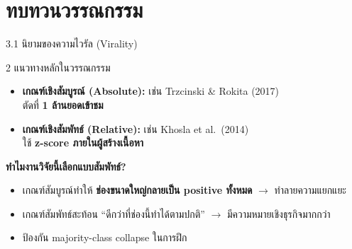 \documentclass[aspectratio=169,11pt,xcolor=dvipsnames]{beamer}
\newcommand{\hl}[1]{\textcolor{kmitlOrange}{\textbf{#1}}}
\begin{document}
\section{ทบทวนวรรณกรรม}

\begin{frame}{3.1 นิยามของความไวรัล (Virality)}
  \begin{block}{2 แนวทางหลักในวรรณกรรม}
    \begin{itemize}
      \item \textbf{เกณฑ์เชิงสัมบูรณ์ (Absolute):} เช่น Trzcinski \& Rokita (2017)\\
        ตัดที่ \hl{1 ล้านยอดเข้าชม}
      \item \textbf{เกณฑ์เชิงสัมพัทธ์ (Relative):} เช่น Khosla et al.\ (2014)\\
        ใช้ \hl{z-score ภายในผู้สร้างเนื้อหา}
    \end{itemize}
  \end{block}
  \textbf{ทำไมงานวิจัยนี้เลือกแบบสัมพัทธ์?}
  \begin{itemize}
    \item เกณฑ์สัมบูรณ์ทำให้ \hl{ช่องขนาดใหญ่กลายเป็น positive ทั้งหมด} $\rightarrow$ ทำลายความแยกแยะ
    \item เกณฑ์สัมพัทธ์สะท้อน ``ดีกว่าที่ช่องนี้ทำได้ตามปกติ'' $\rightarrow$ มีความหมายเชิงธุรกิจมากกว่า
    \item ป้องกัน majority-class collapse ในการฝึก
  \end{itemize}
\end{frame}
\end{document}

